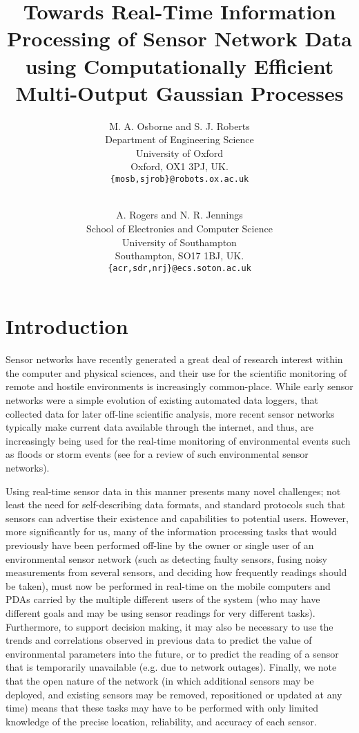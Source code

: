 \documentclass{acmtrans2m}
\title{Towards Real-Time Information Processing of Sensor Network Data using Computationally Efficient Multi-Output Gaussian Processes}
\author{M. A. Osborne and S. J. Roberts\\
Department of Engineering Science\\
University of Oxford\\
Oxford, OX1 3PJ, UK.\\
{\tt{\{mosb,sjrob\}@robots.ox.ac.uk}}\\
\and\\
A. Rogers and N. R. Jennings\\
School of Electronics and Computer Science\\
University of Southampton\\
Southampton, SO17 1BJ, UK.\\
{\tt{\{acr,sdr,nrj\}@ecs.soton.ac.uk}}\\
}
\begin{document}
\begin{bottomstuff}
\end{bottomstuff}

\maketitle

\section{Introduction}

\noindent Sensor networks have recently generated a great deal of research interest within the computer and physical sciences, and their use for the scientific monitoring of remote and hostile environments is increasingly common-place. While early sensor networks were a simple evolution of existing automated data loggers, that collected data for later off-line scientific analysis, more recent sensor networks typically make current data available through the internet, and thus, are increasingly being used for the real-time monitoring of environmental events such as floods or storm events (see  for a review of such environmental sensor networks).

Using real-time sensor data in this manner presents many novel challenges; not least the need for self-describing data formats, and standard protocols such that sensors can advertise their existence and capabilities to potential users. However, more significantly for us, many of the information processing tasks that would previously have been performed off-line by the owner or single user of an environmental sensor network (such as detecting faulty sensors, fusing noisy measurements from several sensors, and deciding how frequently readings should be taken), must now be performed in real-time on the mobile computers and PDAs carried by the multiple different users of the system (who may have different goals and may be using sensor readings for very different tasks). Furthermore, to support decision making, it may also be necessary to use the trends and correlations observed in previous data to predict the value of environmental parameters into the future, or to predict the reading of a sensor that is temporarily unavailable (e.g. due to network outages). Finally, we note that the open nature of the network (in which additional sensors may be deployed, and existing sensors may be removed, repositioned or updated at any time) means that these tasks may have to be performed with only limited knowledge of the precise location, reliability, and accuracy of each sensor.
\end{document}

